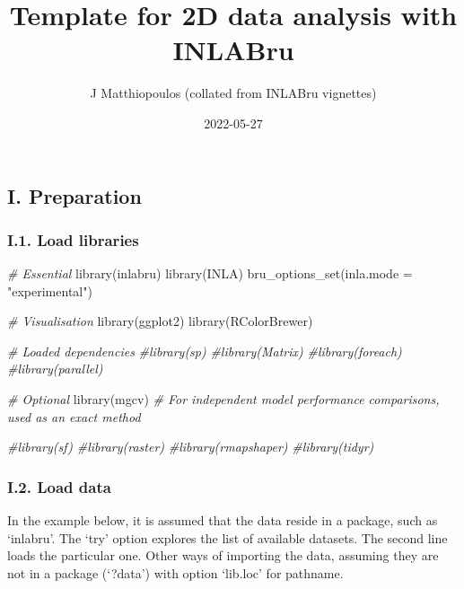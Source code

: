 \documentclass[
]{article}
\title{Template for 2D data analysis with INLABru}
\author{J Matthiopoulos (collated from INLABru vignettes)}
\date{2022-05-27}
\newenvironment{Shaded}{\begin{snugshade}}{\end{snugshade}}
\newcommand{\AttributeTok}[1]{\textcolor[rgb]{0.77,0.63,0.00}{#1}}
\newcommand{\CommentTok}[1]{\textcolor[rgb]{0.56,0.35,0.01}{\textit{#1}}}
\newcommand{\FunctionTok}[1]{\textcolor[rgb]{0.00,0.00,0.00}{#1}}
\newcommand{\NormalTok}[1]{#1}
\newcommand{\StringTok}[1]{\textcolor[rgb]{0.31,0.60,0.02}{#1}}
\begin{document}
\maketitle

\hypertarget{i.-preparation}{%
\subsection{I. Preparation}\label{i.-preparation}}

\hypertarget{i.1.-load-libraries}{%
\subsubsection{I.1. Load libraries}\label{i.1.-load-libraries}}

\begin{Shaded}
\begin{Highlighting}[]
\CommentTok{\# Essential}
\FunctionTok{library}\NormalTok{(inlabru)}
\FunctionTok{library}\NormalTok{(INLA)}
\FunctionTok{bru\_options\_set}\NormalTok{(}\AttributeTok{inla.mode =} \StringTok{"experimental"}\NormalTok{)}

\CommentTok{\# Visualisation}
\FunctionTok{library}\NormalTok{(ggplot2)}
\FunctionTok{library}\NormalTok{(RColorBrewer)}

\CommentTok{\# Loaded dependencies}
\CommentTok{\#library(sp)}
\CommentTok{\#library(Matrix)}
\CommentTok{\#library(foreach)}
\CommentTok{\#library(parallel)}

\CommentTok{\# Optional}
\FunctionTok{library}\NormalTok{(mgcv) }\CommentTok{\# For independent model performance comparisons, used as an exact method}


\CommentTok{\#library(sf)}
\CommentTok{\#library(raster)}
\CommentTok{\#library(rmapshaper)}
\CommentTok{\#library(tidyr)}
\end{Highlighting}
\end{Shaded}

\hypertarget{i.2.-load-data}{%
\subsubsection{I.2. Load data}\label{i.2.-load-data}}

In the example below, it is assumed that the data reside in a package,
such as `inlabru'. The `try' option explores the list of available
datasets. The second line loads the particular one. Other ways of
importing the data, assuming they are not in a package (`?data') with
option `lib.loc' for pathname.
\end{document}
